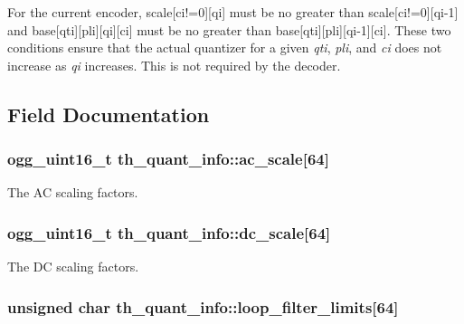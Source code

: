 \-For the current encoder, {\ttfamily scale[ci!=0][qi]} must be no greater than {\ttfamily scale[ci!=0][qi-\/1]} and {\ttfamily base[qti][pli][qi][ci]} must be no greater than {\ttfamily base[qti][pli][qi-\/1][ci]}. \-These two conditions ensure that the actual quantizer for a given {\itshape qti\/}, {\itshape pli\/}, and {\itshape ci\/} does not increase as {\itshape qi\/} increases. \-This is not required by the decoder. 

\subsection{\-Field \-Documentation}
\subsubsection[{ac\-\_\-scale}]{\setlength{\rightskip}{0pt plus 5cm}ogg\-\_\-uint16\-\_\-t {\bf th\-\_\-quant\-\_\-info\-::ac\-\_\-scale}[64]}\label{structth__quant__info_a102f079c8f4a135dc0895c10768aeb06}


\-The \-A\-C scaling factors. 

\subsubsection[{dc\-\_\-scale}]{\setlength{\rightskip}{0pt plus 5cm}ogg\-\_\-uint16\-\_\-t {\bf th\-\_\-quant\-\_\-info\-::dc\-\_\-scale}[64]}\label{structth__quant__info_ad5c1c0d1aa4127fcf864ae747d732ed9}


\-The \-D\-C scaling factors. 

\subsubsection[{loop\-\_\-filter\-\_\-limits}]{\setlength{\rightskip}{0pt plus 5cm}unsigned char {\bf th\-\_\-quant\-\_\-info\-::loop\-\_\-filter\-\_\-limits}[64]}\label{structth__quant__info_a4ac56bf0a45b5743b36daf85d5cd9e33}


